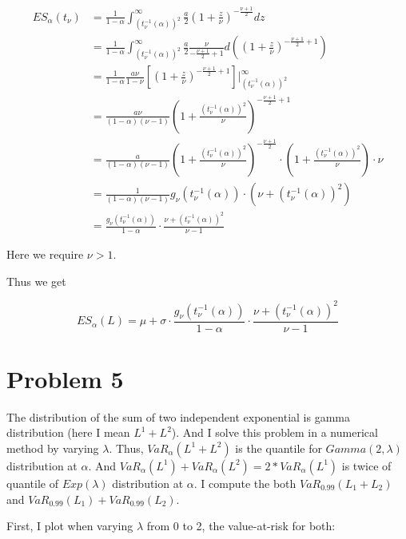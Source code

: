 \documentclass[letterpaper,11pt]{article}
\begin{document}
\begin{spacing}{1.2}
\begin{equation}
\begin{aligned}
ES_{\alpha}(t_{\nu}) &= \frac{1}{1-\alpha} \int_{(t_{\nu}^{-1}(\alpha))^2}^{\infty} \frac{a}{2} (1+\frac{z}{\nu})^{-\frac{\nu+1}{2}} dz \\
&= \frac{1}{1-\alpha} \int_{(t_{\nu}^{-1}(\alpha))^2}^{\infty} \frac{a}{2} \frac{\nu}{-\frac{\nu+1}{2}+1} d((1+\frac{z}{\nu})^{-\frac{\nu+1}{2}+1}) \\
&= \frac{1}{1-\alpha} \frac{a\nu}{1-\nu} [(1+\frac{z}{\nu})^{-\frac{\nu+1}{2}+1}] \Bigg|_{(t_{\nu}^{-1}(\alpha))^2}^{\infty} \\
&= \frac{a\nu}{(1-\alpha)(\nu-1)} (1+\frac{(t_{\nu}^{-1}(\alpha))^2}{\nu})^{-\frac{\nu+1}{2}+1} \\
&= \frac{a}{(1-\alpha)(\nu-1)} (1+\frac{(t_{\nu}^{-1}(\alpha))^2}{\nu})^{-\frac{\nu+1}{2}} \cdot (1+\frac{(t_{\nu}^{-1}(\alpha))^2}{\nu})\cdot \nu  \\
&= \frac{1}{(1-\alpha)(\nu-1)} g_{\nu}(t_{\nu}^{-1}(\alpha)) \cdot (\nu+(t_{\nu}^{-1}(\alpha))^2) \\
&= \frac{g_{\nu}(t_{\nu}^{-1}(\alpha))}{1-\alpha} \cdot \frac{\nu+(t_{\nu}^{-1}(\alpha))^2}{\nu-1}
\end{aligned}
\end{equation}

Here we require $\nu > 1$.

Thus we get 

$$
ES_{\alpha}(L) = \mu + \sigma \cdot \frac{g_{\nu}(t_{\nu}^{-1}(\alpha))}{1-\alpha} \cdot \frac{\nu+(t_{\nu}^{-1}(\alpha))^2}{\nu-1}
$$

\section*{Problem 5}
The distribution of the sum of two independent exponential is gamma distribution (here I mean $L^1+L^2$). And I solve this problem in a numerical method by varying $\lambda$. Thus, $VaR_{\alpha}(L^1+L^2)$ is the quantile for $Gamma(2,\lambda)$ distribution at $\alpha$. And $VaR_{\alpha}(L^1)+VaR_{\alpha}(L^2) = 2*VaR_{\alpha}(L^1)$ is twice of quantile of $Exp(\lambda)$ distribution at $\alpha$. I compute the both $VaR_{0.99}(L_1+L_2)$ and $VaR_{0.99}(L_1)+VaR_{0.99}(L_2)$.


First, I plot when varying $\lambda$ from 0 to 2, the value-at-risk for both:


\end{spacing}
\end{document}
